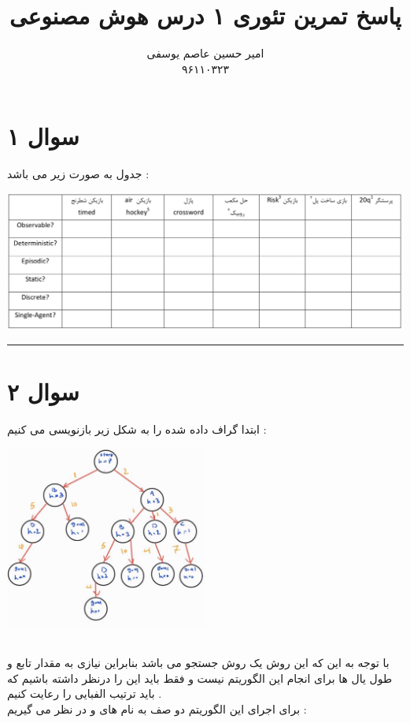 \documentclass{article}
\title{پاسخ تمرین تئوری ۱ درس هوش مصنوعی  }
\author{امیر حسین عاصم یوسفی \\ ۹۶۱۱۰۳۲۳}
\begin{document}
	\maketitle
	
	\section*{سوال ۱ }
	جدول به صورت زیر می باشد  : 
	\begin{center}
		\includegraphics[width=1\textwidth]{table}
	\end{center}
	
	\hrule
	\section*{سوال ۲ }
	ابتدا گراف داده شده را به شکل زیر بازنویسی می کنیم  : 
	\begin{center}
	\includegraphics[width=0.5\textwidth]{q2p1}
\end{center}
\newpage
\subsection*{\textcolor{red}{}}
با توجه به این که این روش یک روش جستجو 
 می باشد بنابراین نیازی به  مقدار تابع 
  و طول یال ها برای انجام این الگوریتم نیست و فقط باید این را درنظر داشته باشیم که باید ترتیب الفبایی را رعایت کنیم   . \\
برای اجرای این الگوریتم دو صف به نام های 
و 
در نظر می گیریم  : 
\end{document}
